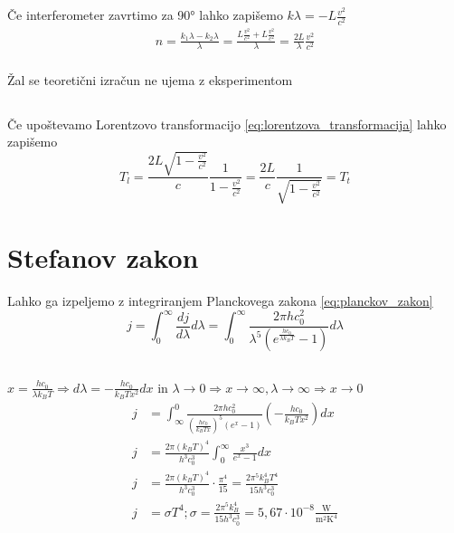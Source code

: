 \documentclass[a4paper,12pt]{article}
\begin{document}
\subsection{}
Če interferometer zavrtimo za 90° lahko zapišemo $k \lambda = -L \frac{v^2}{c^2}$ 
\begin{align}
    n = \frac{k_1\lambda - k_2\lambda}{\lambda} = \frac{L \frac{v^2}{c^2} + L \frac{v^2}{c^2}}{\lambda} = \frac{2 L}{\lambda} \frac{v^2}{c^2}\\
\end{align}

Žal se teoretični izračun ne ujema z eksperimentom

\subsection{}
Če upoštevamo Lorentzovo transformacijo \ref{eq:lorentzova_transformacija} lahko zapišemo
\begin{equation}
    T_l = \frac{2L\sqrt{1 - \frac{v^2}{c^2}}}{c} \frac{1}{1 - \frac{v^2}{c^2}} = \frac{2L}{c} \frac{1}{\sqrt{1 - \frac{v^2}{c^2}}} = T_t
\end{equation}

\section{Stefanov zakon}
Lahko ga izpeljemo z integriranjem Planckovega zakona \ref{eq:planckov_zakon}
\begin{equation}
    j = \int_0^\infty \frac{dj}{d\lambda} d\lambda = \int_0^\infty \frac{2 \pi hc_0^2}{\lambda^5\left(e^{\frac{hc_0}{\lambda k_B T}} - 1\right)} d\lambda
\end{equation}

\subsection{}
$x = \frac{hc_0}{\lambda k_B T} \Rightarrow d\lambda = -\frac{hc_0}{k_B T x^2} dx$ in $\lambda  \to 0 \Rightarrow x \to \infty, \lambda \to \infty \Rightarrow x \to 0$
\begin{align}
    j &= \int_\infty^0 \frac{2 \pi hc_0^2}{\left(\frac{hc_0}{k_B T x}\right)^5 \left(e^x - 1\right)} \left(-\frac{hc_0}{k_B T x^2}\right) dx \\
    j &= \frac{2 \pi (k_B T)^4}{h^3 c_0^3} \int_0^\infty \frac{x^3}{e^x - 1} dx \\
    j &= \frac{2 \pi (k_B T)^4}{h^3 c_0^3} \cdot \frac{\pi^4}{15} = \frac{2 \pi^5 k_B^4 T^4}{15 h^3 c_0^3} \\
    j &= \sigma T^4; \sigma = \frac{2 \pi^5 k_B^4}{15 h^3 c_0^3} = 5,67 \cdot 10^{-8} \frac{\text{W}}{\text{m}^2 \text{K}^4}
\end{align}
\end{document}
